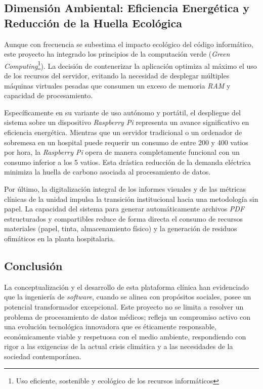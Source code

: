 \subsection{Dimensión Ambiental: Eficiencia Energética y Reducción de la Huella Ecológica}
Aunque con frecuencia se subestima el impacto ecológico del código informático, este proyecto ha integrado los principios de la computación verde (\textit{Green Computing}\footnote{Uso eficiente, sostenible y ecológico de los recursos informáticos}). La decisión de contenerizar la aplicación optimiza al máximo el uso de los recursos del servidor, evitando la necesidad de desplegar múltiples máquinas virtuales pesadas que consumen un exceso de memoria \textit{RAM} y capacidad de procesamiento.

Específicamente en su variante de uso autónomo y portátil, el despliegue del sistema sobre un dispositivo \textit{Raspberry Pi} representa un avance significativo en eficiencia energética. Mientras que un servidor tradicional o un ordenador de sobremesa en un hospital puede requerir un consumo de entre 200 y 400 vatios por hora, la \textit{Raspberry Pi} opera de manera completamente funcional con un consumo inferior a los 5 vatios. Esta drástica reducción de la demanda eléctrica minimiza la huella de carbono asociada al procesamiento de datos.

Por último, la digitalización integral de los informes visuales y de las métricas clínicas de la unidad impulsa la transición institucional hacia una metodología sin papel. La capacidad del sistema para generar automáticamente archivos \textit{PDF} estructurados y compartibles reduce de forma directa el consumo de recursos materiales (papel, tinta, almacenamiento físico) y la generación de residuos ofimáticos en la planta hospitalaria.

\subsection{Conclusión}
La conceptualización y el desarrollo de esta plataforma clínica han evidenciado que la ingeniería de \textit{software}, cuando se alinea con propósitos sociales, posee un potencial transformador excepcional. Este proyecto no se limita a resolver un problema de procesamiento de datos médicos; refleja un compromiso activo con una evolución tecnológica innovadora que es éticamente responsable, económicamente viable y respetuosa con el medio ambiente, respondiendo con rigor a las exigencias de la actual crisis climática y a las necesidades de la sociedad contemporánea.